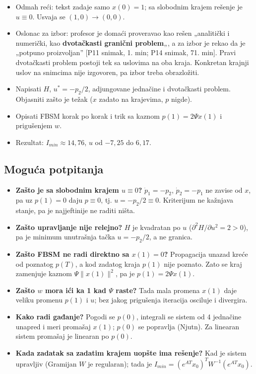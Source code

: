 \documentclass[11pt,a4paper,parskip=half,headsepline,numbers=noenddot]{scrartcl}
\DeclareRobustCommand{\izvor}[1]{{\small\color{izvorC}[#1]}}
\begin{document}
\begin{ispit}[{Pitanje 6}]
\begin{itemize}
\item Odmah reći: tekst zadaje samo \(x(0) = 1\); sa slobodnim krajem rešenje je \(u \equiv 0\). Usvaja se \((1, 0) \to (0, 0)\).
\item Oslonac za izbor: profesor je domaći proveravao kao rešen „analitički i numerički, kao \textbf{dvotačkasti granični problem}„, a za izbor je rekao da je „potpuno proizvoljan'' \izvor{P11 snimak, 1. min; P14 snimak, 71. min}. Pravi dvotačkasti problem postoji tek sa uslovima na oba kraja. Konkretan krajnji uslov na snimcima nije izgovoren, pa izbor treba obrazložiti.
\item Napisati \(H\), \(u^* = -p_2/2\), adjungovane jednačine i dvotačkasti problem. Objasniti zašto je težak (\(x\) zadato na krajevima, \(p\) nigde).
\item Opisati FBSM korak po korak i trik sa kaznom \(p(1) = 2\Psi x(1)\) i prigušenjem \(w\).
\item Rezultat: \(I_{min} \approx 14{,}76\), \(u\) od \(-7{,}25\) do \(6{,}17\).
\end{itemize}
\end{ispit}

\subsection{Moguća potpitanja}

\begin{itemize}
\item \textbf{Zašto je sa slobodnim krajem \(u \equiv 0\)?} \(\dot p_1 = -p_2\), \(\dot p_2 = -p_1\) ne zavise od \(x\), pa uz \(p(1) = 0\) daju \(p \equiv 0\), tj. \(u = -p_2/2 \equiv 0\). Kriterijum ne kažnjava stanje, pa je najjeftinije ne raditi ništa.
\item \textbf{Zašto upravljanje nije relejno?} \(H\) je kvadratan po \(u\) (\(\partial^2H/\partial u^2 = 2 > 0\)), pa je minimum unutrašnja tačka \(u = -p_2/2\), a ne granica.
\item \textbf{Zašto FBSM ne radi direktno sa \(x(1) = 0\)?} Propagacija unazad kreće od poznatog \(p(T)\), a kod zadatog kraja \(p(1)\) nije poznato. Zato se kraj zamenjuje kaznom \(\Psi\|x(1)\|^2\), pa je \(p(1) = 2\Psi x(1)\).
\item \textbf{Zašto \(w\) mora ići ka 1 kad \(\Psi\) raste?} Tada mala promena \(x(1)\) daje veliku promenu \(p(1)\) i \(u\); bez jakog prigušenja iteracija osciluje i divergira.
\item \textbf{Kako radi gađanje?} Pogodi se \(p(0)\), integrali se sistem od 4 jednačine unapred i meri promašaj \(x(1)\); \(p(0)\) se popravlja (Njutn). Za linearan sistem promašaj je linearan po \(p(0)\).
\item \textbf{Kada zadatak sa zadatim krajem uopšte ima rešenje?} Kad je sistem upravljiv (Gramijan \(W\) je regularan); tada je \(I_{min} = (e^{AT}x_0)^TW^{-1}(e^{AT}x_0)\).
\end{itemize}
\end{document}
